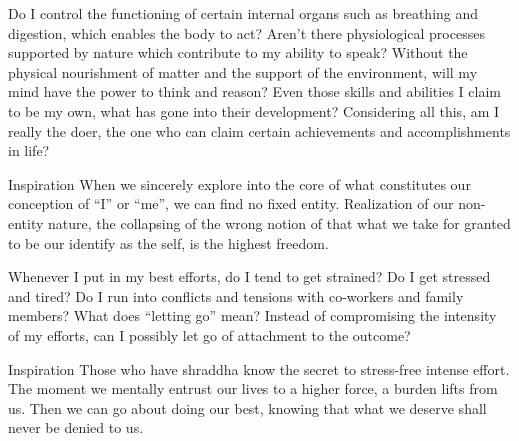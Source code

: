 
\newpage
\begin{mananam}{} 
\mananamtext Do I control the functioning of certain internal organs such as breathing and digestion, which enables the body to act? Aren’t there physiological processes supported by nature which contribute to my ability to speak? Without the physical nourishment of matter and the support of the environment, will my mind have the power to think and reason? Even those skills and abilities I claim to be my own, what has gone into their development? Considering all this, am I really the doer, the one who can claim certain achievements and accomplishments in life?
\end{mananam}
\WritingHand{}
\begin{inspiration}{\mananamfont Inspiration}
\mananamtext When we sincerely explore into the core of what constitutes our conception of “I” or “me”, we can find no fixed entity. Realization of our non-entity nature, the collapsing of the wrong notion of that what we take for granted to be our identify as the self, is the highest freedom.
\end{inspiration}
\newpage

\newpage
\begin{mananam}{} 
\mananamtext Whenever I put in my best efforts, do I tend to get strained? Do I get stressed and tired? Do I run into conflicts and tensions with co-workers and family members? What does “letting go” mean? Instead of compromising the intensity of my efforts, can I possibly let go of attachment to the outcome?
\end{mananam}
\WritingHand{}
\begin{inspiration}{\mananamfont Inspiration}
\mananamtext Those who have shraddha know the secret to stress-free intense effort. The moment we mentally entrust our lives to a higher force, a burden lifts from us. Then we can go about doing our best, knowing that what we deserve shall never be denied to us.
\end{inspiration}
\newpage

